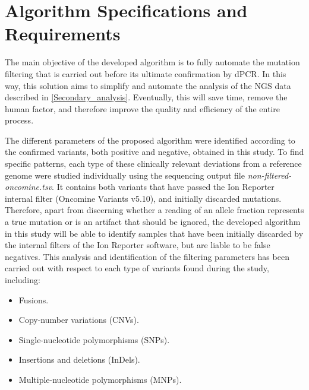 \section{Algorithm Specifications and Requirements} \label{Ch3:Algorithm}

The main objective of the developed algorithm is to fully automate the mutation filtering that is carried out before its ultimate confirmation by dPCR. In this way, this solution aims to simplify and automate the analysis of the NGS data described in \autoref{Secondary_analysis}. Eventually, this will save time, remove the human factor, and therefore improve the quality and efficiency of the entire process.

The different parameters of the proposed algorithm were identified according to the confirmed variants, both positive and negative, obtained in this study. To find specific patterns, each type of these clinically relevant deviations from a reference genome were studied individually using the sequencing output file \textit{non-filtered-oncomine.tsv}. It contains both variants that have passed the Ion Reporter\texttrademark{} internal filter (Oncomine\texttrademark{} Variants v5.10), and initially discarded mutations. Therefore, apart from discerning whether a reading of an allele fraction represents a true mutation or is an artifact that should be ignored, the developed algorithm in this study will be able to identify samples that have been initially discarded by the internal filters of the Ion Reporter\texttrademark{} software, but are liable to be false negatives. This analysis and identification of the filtering parameters has been carried out with respect to each type of variants found during the study, including:
\begin{itemize}
    \item Fusions.
    \item Copy-number variations (CNVs).
    \item Single-nucleotide polymorphisms (SNPs).
    \item Insertions and deletions (InDels).
    \item Multiple-nucleotide polymorphisms (MNPs).
\end{itemize}

